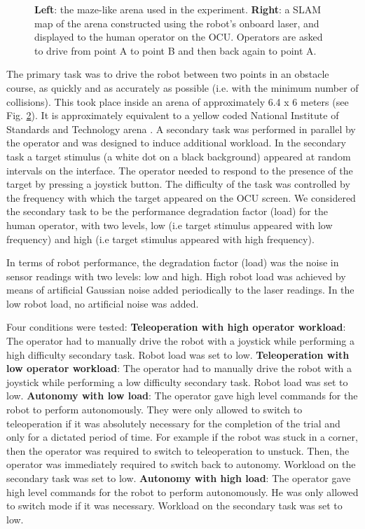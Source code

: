 \documentclass[a4paper,12pt,oneside,openright]{bhamthesis}
\begin{document}
\begin{figure}
\begin{subfigure}[b]{0.45\textwidth}
		\label{subfig:map_pilot}
	\end{subfigure}
	\caption{\textbf{Left}: the maze-like arena used in the experiment. \textbf{Right}: a SLAM map of the arena constructed using the robot's onboard laser, and displayed to the human operator on the OCU. Operators are asked to drive from point A to point B and then back again to point A.}
	\label{fig:arena_pilot}
\end{figure}

The primary task was to drive the robot between two points in an obstacle course, as quickly and as accurately as possible (i.e. with the minimum number of collisions). This took place inside an arena of approximately 6.4 x 6 meters (see Fig. \ref{fig:arena_pilot}). It is approximately equivalent to a yellow coded National Institute of Standards and Technology arena \cite{Jacoff2003a}. A secondary task was performed in parallel by the operator and was designed to induce additional workload. In the secondary task a target stimulus (a white dot on a black background) appeared at random intervals on the interface. The operator needed to respond to the presence of the target by pressing a joystick button. The difficulty of the task was controlled by the frequency with which the target appeared on the OCU screen. We considered the secondary task to be the performance degradation factor (load) for the human operator, with two levels, low (i.e target stimulus appeared with low frequency) and high (i.e target stimulus appeared with high frequency).

In terms of robot performance, the degradation factor (load) was the noise in sensor readings with two levels: low and high. High robot load was achieved by means of artificial Gaussian noise added periodically to the laser readings. In the low robot load, no artificial noise was added.

Four conditions were tested: \textbf{Teleoperation with high operator workload}: The operator had to manually drive the robot with a joystick while performing a high difficulty secondary task. Robot load was set to low. \textbf{Teleoperation with low operator workload}: The operator had to manually drive the robot with a joystick while performing a low difficulty secondary task. Robot load was set to low. \textbf{Autonomy with low load}: The operator gave high level commands for the robot to perform autonomously. They were only allowed to switch to teleoperation if it was absolutely necessary for the completion of the trial and only for a dictated period of time. For example if the robot was stuck in a corner, then the operator was required to switch to teleoperation to unstuck. Then, the operator was immediately required to switch back to autonomy. Workload on the secondary task was set to low. \textbf{Autonomy with high load}: The operator gave high level commands for the robot to perform autonomously. He was only allowed to switch mode if it was necessary. Workload on the secondary task was set to low.
\end{document}
